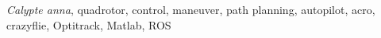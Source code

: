 \documentclass[onecolumn,10pt]{IEEEtran}
\newcommand{\Calypteanna}{\emph{Calypte anna}}
\newcommand{\Matlab}{Matlab}
\begin{document}
\begin{abstract}
\end{abstract}

\begin{IEEEkeywords}
\Calypteanna, quadrotor, control, maneuver, path planning, autopilot, acro, crazyflie, Optitrack, \Matlab, ROS
\end{IEEEkeywords}


\end{document}
